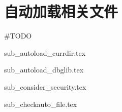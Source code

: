 \section{自动加载相关文件}

\#TODO

{sub_autoload_currdir.tex}

{sub_autoload_dbglib.tex}

{sub_consider_security.tex}

{sub_checkauto_file.tex}

